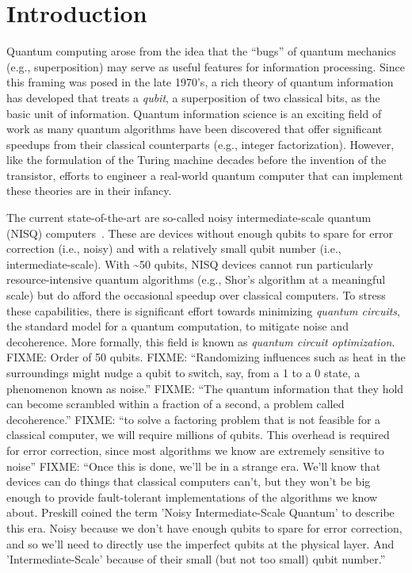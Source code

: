 \chapter[Introduction]{Introduction} \label{ch:intro}


Quantum computing arose from the idea that the ``bugs'' of quantum mechanics (e.g., superposition) may serve as useful features for information processing.
Since this framing was posed in the late 1970's, a rich theory of quantum information has developed that treats a \emph{qubit}, a superposition of two classical bits, as the basic unit of information.
Quantum information science is an exciting field of work as many quantum algorithms have been discovered that offer significant speedups from their classical counterparts (e.g., integer factorization).
However, like the formulation of the Turing machine decades before the invention of the transistor, efforts to engineer a real-world quantum computer that can implement these theories are in their infancy.

The current state-of-the-art are so-called noisy intermediate-scale quantum (NISQ) computers~\cite{preskill2018quantum}.
These are devices without enough qubits to spare for error correction (i.e., noisy) and with a relatively small qubit number (i.e., intermediate-scale).
With \textasciitilde 50 qubits, NISQ devices cannot run particularly resource-intensive quantum algorithms (e.g., Shor's algorithm at a meaningful scale) but do afford the occasional speedup over classical computers.
To stress these capabilities, there is significant effort towards minimizing \emph{quantum circuits}, the standard model for a quantum computation, to mitigate noise and decoherence.
More formally, this field is known as \emph{quantum circuit optimization}.
\iffalse
FIXME: Order of 50 qubits.
FIXME: ``Randomizing influences such as heat in the surroundings might nudge a qubit to switch, say, from a 1 to a 0 state, a phenomenon known as noise.''
FIXME: ``The quantum information that they hold can become scrambled within a fraction of a second, a problem called decoherence.''
FIXME: ``to solve a factoring problem that is not feasible for a classical computer, we will require millions of qubits. This overhead is required for error correction, since most algorithms we know are extremely sensitive to noise''
FIXME: ``Once this is done, we'll be in a strange era. We'll know that devices can do things that classical computers can't, but they won't be big enough to provide fault-tolerant implementations of the algorithms we know about. Preskill coined the term 'Noisy Intermediate-Scale Quantum' to describe this era. Noisy because we don't have enough qubits to spare for error correction, and so we'll need to directly use the imperfect qubits at the physical layer. And 'Intermediate-Scale' because of their small (but not too small) qubit number.''

